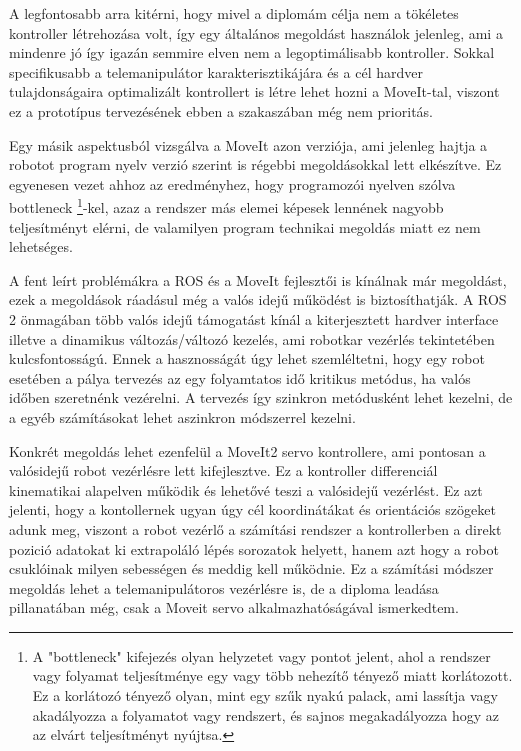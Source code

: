 A legfontosabb arra kitérni, hogy mivel a diplomám célja nem a tökéletes kontroller létrehozása volt, így egy általános megoldást használok jelenleg, ami a mindenre jó így igazán semmire elven nem a legoptimálisabb kontroller. Sokkal specifikusabb a telemanipulátor karakterisztikájára és a cél hardver tulajdonságaira optimalizált kontrollert is létre lehet hozni a MoveIt-tal, viszont ez a prototípus tervezésének ebben a szakaszában még nem prioritás.

Egy másik aspektusból vizsgálva a MoveIt azon verziója, ami jelenleg hajtja a robotot program nyelv verzió szerint is régebbi megoldásokkal lett elkészítve. Ez egyenesen vezet ahhoz az eredményhez, hogy programozói nyelven szólva bottleneck \footnote{A "bottleneck" kifejezés olyan helyzetet vagy pontot jelent, ahol a rendszer vagy folyamat teljesítménye egy vagy több nehezítő tényező miatt korlátozott. Ez a korlátozó tényező olyan, mint egy szűk nyakú palack, ami lassítja vagy akadályozza a folyamatot vagy rendszert, és sajnos megakadályozza hogy az az elvárt teljesítményt nyújtsa.}-kel, azaz a rendszer más elemei képesek lennének nagyobb teljesítményt elérni, de valamilyen program technikai megoldás miatt ez nem lehetséges.

A fent leírt problémákra a ROS és a MoveIt fejlesztői is kínálnak már megoldást, ezek a megoldások ráadásul még a valós idejű működést is biztosíthatják. A ROS 2 önmagában több valós idejű támogatást kínál a kiterjesztett hardver interface illetve a dinamikus változás/változó kezelés, ami robotkar vezérlés tekintetében kulcsfontosságú. Ennek a hasznosságát úgy lehet szemléltetni, hogy egy robot esetében a pálya tervezés az egy folyamtatos idő kritikus metódus, ha valós időben szeretnénk vezérelni. A tervezés így szinkron metódusként lehet kezelni, de a egyéb számításokat lehet aszinkron módszerrel kezelni.

Konkrét megoldás lehet ezenfelül a MoveIt2 servo kontrollere, ami pontosan a valósidejű robot vezérlésre lett kifejlesztve. Ez a kontroller differenciál kinematikai alapelven működik és lehetővé teszi a valósidejű vezérlést. Ez azt jelenti, hogy a kontollernek ugyan úgy cél koordinátákat és orientációs szögeket adunk meg, viszont a robot vezérlő a számítási rendszer a kontrollerben a direkt pozició adatokat ki extrapoláló lépés sorozatok helyett, hanem azt hogy a robot csuklóinak milyen sebességen és meddig kell működnie. Ez a számítási módszer megoldás lehet a telemanipulátoros vezérlésre is, de a diploma leadása pillanatában még, csak a Moveit servo alkalmazhatóságával ismerkedtem.

